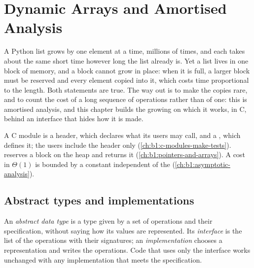 \chapter{Dynamic Arrays and Amortised Analysis}\label{ch:b1:dynamic-arrays}

A Python list grows by one element at a time, millions of times, and each  takes about the same short
time however long the list already is. Yet a list lives in one block of memory, and a block cannot grow in place: when
it is full, a larger block must be reserved and every element copied into it, which costs time proportional to the
length. Both statements are true. The way out is to make the copies rare, and to count the cost of a long sequence of
operations rather than of one: this is amortised analysis, and this chapter builds the growing  on which it
works, in C, behind an interface that hides how it is made.

\begin{recall}
A C module is a header, which declares what its users may call, and a , which defines it; the users include
the header only (\cref{ch:b1:c-modules-make-tests}).  reserves a block on the heap and  returns
it (\cref{ch:b1:pointers-and-arrays}). A cost in $\Theta(1)$ is bounded by a constant independent of the  (\cref{ch:b1:asymptotic-analysis}).
\end{recall}

\section{Abstract types and implementations}\label{sec:b1:dynamic-arrays:adt}

\begin{definition}\label{def:b1:dynamic-arrays:adt}
An \emph{abstract data type} is a type given by a set of operations and their specification,
without saying how its values are represented. Its \emph{interface} is the list of the operations with their
signatures; an \emph{implementation} chooses a representation and writes the operations. Code that uses only the
interface works unchanged with any implementation that meets the specification.
\end{definition}

